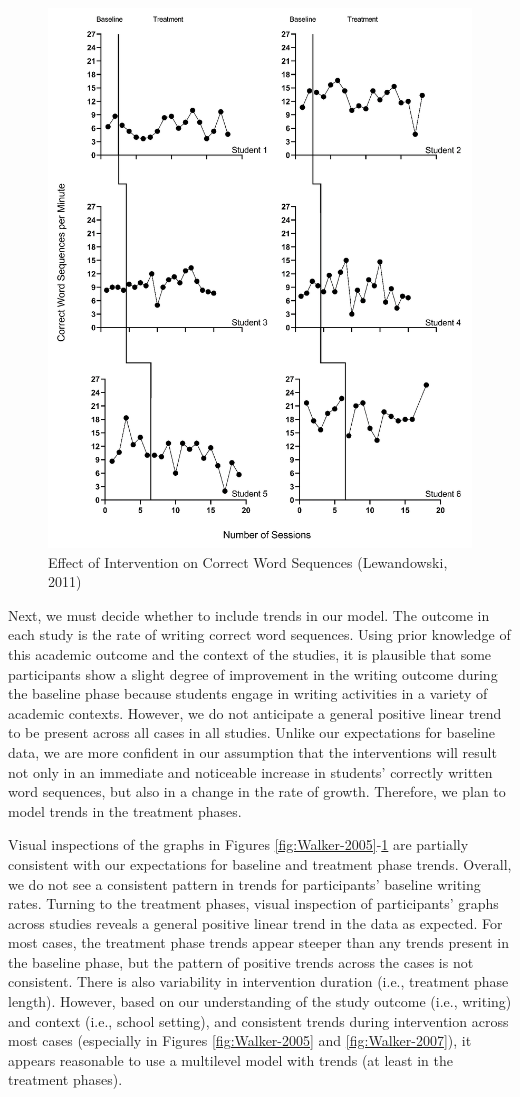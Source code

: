 \documentclass[
]{book}
\begin{document}
\begin{figure}
\includegraphics[width=0.6\linewidth]{images/Lewandowski2011} \caption{Effect of Intervention on Correct Word Sequences (Lewandowski, 2011)}\label{fig:Lewandowski-2011}
\end{figure}

Next, we must decide whether to include trends in our model. The outcome in each study is the rate of writing correct word sequences. Using prior knowledge of this academic outcome and the context of the studies, it is plausible that some participants show a slight degree of improvement in the writing outcome during the baseline phase because students engage in writing activities in a variety of academic contexts. However, we do not anticipate a general positive linear trend to be present across all cases in all studies. Unlike our expectations for baseline data, we are more confident in our assumption that the interventions will result not only in an immediate and noticeable increase in students' correctly written word sequences, but also in a change in the rate of growth. Therefore, we plan to model trends in the treatment phases.

Visual inspections of the graphs in Figures \ref{fig:Walker-2005}-\ref{fig:Lewandowski-2011} are partially consistent with our expectations for baseline and treatment phase trends. Overall, we do not see a consistent pattern in trends for participants' baseline writing rates. Turning to the treatment phases, visual inspection of participants' graphs across studies reveals a general positive linear trend in the data as expected. For most cases, the treatment phase trends appear steeper than any trends present in the baseline phase, but the pattern of positive trends across the cases is not consistent. There is also variability in intervention duration (i.e., treatment phase length). However, based on our understanding of the study outcome (i.e., writing) and context (i.e., school setting), and consistent trends during intervention across most cases (especially in Figures \ref{fig:Walker-2005} and \ref{fig:Walker-2007}), it appears reasonable to use a multilevel model with trends (at least in the treatment phases).
\end{document}

